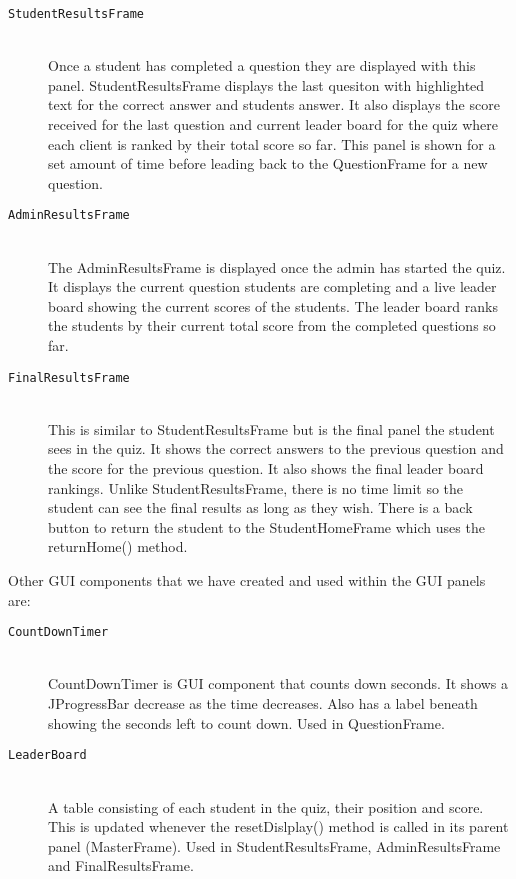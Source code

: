\begin{description}
\begin{description}
		\item[\texttt{StudentResultsFrame}]\hfill \\ Once a student has 
			completed a question they are displayed with this panel. 
			StudentResultsFrame displays the last quesiton with highlighted 
			text for the correct answer and students answer. It also 
			displays the score received for the last question and current 
			leader board for the quiz where each client is ranked by their 
			total score so far. This panel is shown for a set amount of time 
			before leading back to the QuestionFrame for a new question.

		\item[\texttt{AdminResultsFrame}]\hfill \\ The AdminResultsFrame is 
			displayed once the admin has started the quiz. It displays the 
			current question students are completing and a live leader board 
			showing the current scores of the students. The leader board 
			ranks the students by their current total score from the 
			completed questions so far. 

		\item[\texttt{FinalResultsFrame}]\hfill \\ This is similar to 
			StudentResultsFrame but is the final panel the student sees in 
			the quiz. It shows the correct answers to the previous question 
			and the score for the previous question. It also shows the final 
			leader board rankings. Unlike StudentResultsFrame, there is no 
			time limit so the student can see the final results as long as 
			they wish. There is a back button to return the student to the 
			StudentHomeFrame which uses the returnHome() method.
		
	\end{description}

	Other GUI components that we have created and used within the GUI panels are:

	\begin{description}
	
		\item[\texttt{CountDownTimer}]\hfill \\ CountDownTimer is GUI component 
			that counts down seconds. It shows a JProgressBar decrease as 
			the time decreases. Also has a label beneath showing the seconds 
			left to count down. Used in QuestionFrame. 

		\item[\texttt{LeaderBoard}]\hfill \\ A table consisting of each student 
			in the quiz, their position and score. This is updated whenever 
			the resetDislplay() method is called in its parent panel 
			(MasterFrame). Used in StudentResultsFrame, AdminResultsFrame 
			and FinalResultsFrame.
	
	\end{description}
	
\end{description}


